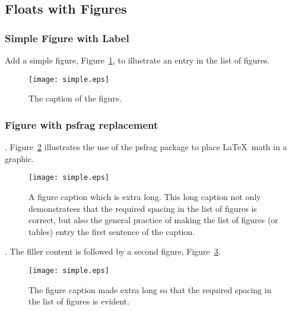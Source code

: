 \subsection{Floats with Figures}

\lipsum[12-13]

\subsubsection{Simple Figure with Label}

\lipsum[11]

Add a simple figure, Figure~\ref{fig:fig00}, to illustrate
an entry in the list of figures. %
\begin{figure}[tb]
  \begin{center}
   \texttt{[image: simple.eps]}
  \end{center}
  \caption{The caption of the figure.}
\label{fig:fig00}
\end{figure}%
\lipsum[12]

\subsubsection{Figure with psfrag replacement}

\lipsum[13].  Figure~\ref{fig:fig01} illustrates the use
of the psfrag package to place \LaTeX\ math in a graphic.%
\begin{figure}[tb]
  \begin{center}
   \texttt{[image: simple.eps]}
  \end{center}
  \caption[A figure caption which is extra long.]{A figure caption
    which is extra long. This long caption not only demonstratees that
    the required spacing in the list of figures is correct, but also
    the general practice of making the list of figures (or tables)
    entry the first sentence of the caption.}
\label{fig:fig01}
\end{figure}
\lipsum[14]. The filler content is followed by a second figure,
Figure~\ref{fig:fig02}.  %
\begin{figure}[tb]
  \begin{center}
   \texttt{[image: simple.eps]}
  \end{center}
  \caption{The figure caption made extra long so that the
    required spacing in the list of figures is evident.}
\label{fig:fig02}
\end{figure}
\lipsum[15]

